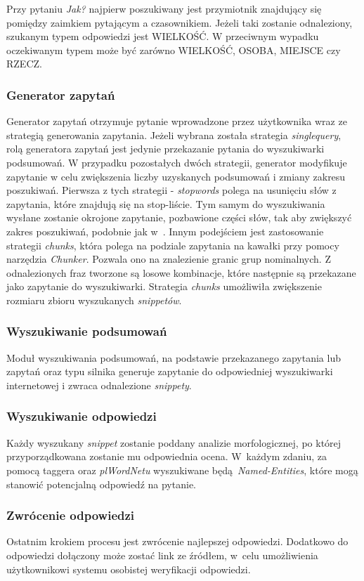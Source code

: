 Przy pytaniu \emph{Jak?} najpierw poszukiwany jest przymiotnik znajdujący się pomiędzy zaimkiem pytającym a czasownikiem. Jeżeli taki zostanie odnaleziony, szukanym typem odpowiedzi jest WIELKOŚĆ. W przeciwnym wypadku oczekiwanym typem może być zarówno WIELKOŚĆ, OSOBA, MIEJSCE czy RZECZ. 

\subsubsection{Generator zapytań}
Generator zapytań otrzymuje pytanie wprowadzone przez użytkownika wraz ze strategią generowania zapytania. Jeżeli wybrana została strategia \emph{singlequery}, rolą generatora zapytań jest jedynie przekazanie pytania do wyszukiwarki podsumowań. W przypadku pozostałych dwóch strategii, generator modyfikuje zapytanie w celu  zwiększenia liczby uzyskanych podsumowań i zmiany zakresu poszukiwań. Pierwsza z tych strategii - \emph{stopwords} polega na usunięciu słów z zapytania, które znajdują się na stop-liście. Tym samym do wyszukiwania wysłane zostanie okrojone zapytanie, pozbawione części słów, tak aby zwiększyć zakres poszukiwań, podobnie jak w~\cite{brill2002analysis}. Innym podejściem jest zastosowanie strategii \emph{chunks}, która polega na podziale zapytania na kawałki przy pomocy narzędzia \emph{Chunker}. Pozwala ono na znalezienie granic grup nominalnych. Z odnalezionych fraz tworzone są losowe kombinacje, które następnie są przekazane jako zapytanie do wyszukiwarki. Strategia \emph{chunks} umożliwiła zwiększenie rozmiaru zbioru wyszukanych \emph{snippetów}.
 
\subsubsection{Wyszukiwanie podsumowań}
Moduł wyszukiwania podsumowań, na podstawie przekazanego zapytania lub zapytań oraz typu silnika generuje zapytanie do odpowiedniej wyszukiwarki internetowej i zwraca odnalezione \emph{snippety}.

\subsubsection{Wyszukiwanie odpowiedzi}
Każdy wyszukany \emph{snippet} zostanie poddany analizie morfologicznej, po której przyporządkowana zostanie mu odpowiednia ocena. W~każdym zdaniu, za pomocą taggera oraz \emph{plWordNetu} wyszukiwane będą \emph{Named-Entities}, które mogą stanowić potencjalną odpowiedź na pytanie.

\subsubsection{Zwrócenie odpowiedzi}
Ostatnim krokiem procesu jest zwrócenie najlepszej odpowiedzi. Dodatkowo do odpowiedzi dołączony może zostać link ze źródłem, w~celu umożliwienia użytkownikowi systemu osobistej weryfikacji odpowiedzi.


